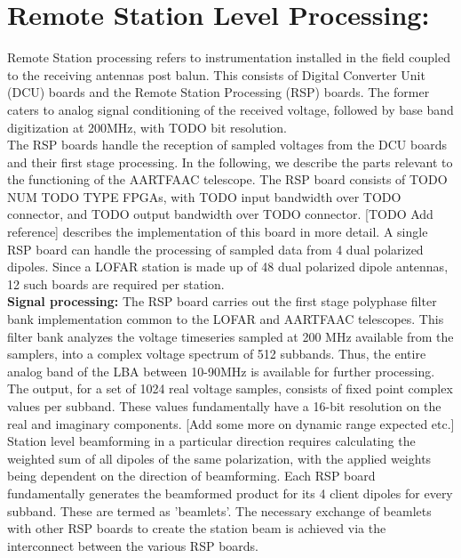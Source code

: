 \documentclass{ws-jai}
\begin{document}
\section {\label{sec:station_hardware} Remote Station Level Processing:} 
Remote  Station processing  refers  to instrumentation  installed  in the  field
coupled to the receiving antennas post balun. This consists of Digital Converter
Unit (DCU)  boards and the  Remote Station  Processing (RSP) boards.  The former
caters to analog  signal conditioning of the received voltage,  followed by base
band digitization  at 200MHz, with TODO bit resolution.\\

The RSP boards handle the reception of  sampled voltages from the DCU boards and
their first stage  processing. In the following, we describe  the parts relevant
to  the functioning  of  the  AARTFAAC telescope.   The  RSP  board consists  of
TODO NUM TODO TYPE  FPGAs, with  TODO input bandwidth  over TODO  connector, and
TODO output bandwidth  over TODO connector.  [TODO Add  reference] describes the
implementation of this board  in more detail. A single RSP  board can handle the
processing of sampled data from 4 dual polarized dipoles.  Since a LOFAR station
is made up of 48 dual polarized dipole antennas, 12 such boards are required per
station.\\

\textbf {Signal processing:} The RSP board carries out the first stage polyphase
filter bank  implementation common  to the LOFAR  and AARTFAAC  telescopes. This
filter bank  analyzes the voltage timeseries  sampled at 200 MHz  available from
the samplers, into a complex voltage  spectrum of 512 subbands. Thus, the entire
analog band of the LBA between 10-90MHz is available for further processing. The
output, for a set of 1024 real  voltage samples, consists of fixed point complex
values per subband.  These values fundamentally have a 16-bit  resolution on the
real and imaginary components. [Add some more on dynamic range expected etc.]\\

Station level  beamforming in  a particular  direction requires  calculating the
weighted sum of  all dipoles of the same polarization,  with the applied weights
being dependent on  the direction of beamforming.  Each  RSP board fundamentally
generates the  beamformed product for  its 4  client dipoles for  every subband.
These are termed  as 'beamlets'.  The necessary exchange of  beamlets with other
RSP boards to  create the station beam is achieved  via the interconnect between
the various RSP boards.\\
\end{document}
